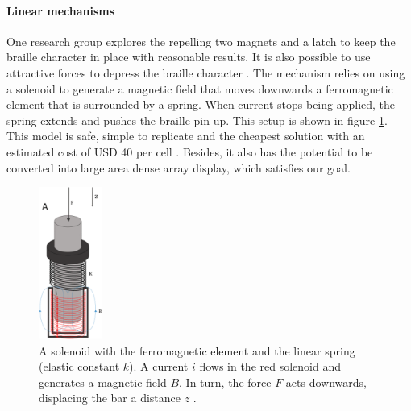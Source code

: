 \paragraph{Linear mechanisms}
One research group explores the repelling two magnets and a latch to keep the braille character in place \cite{kim_braille_2020} with reasonable results.
It is also possible to use attractive forces to depress the braille character \cite{bettelani_design_2020}.
The mechanism relies on using a solenoid to generate a magnetic field that moves downwards a ferromagnetic element that is surrounded by a spring.
When current stops being applied, the spring extends and pushes the braille pin up.
This setup is shown in figure \ref{fig:magnetic-spring.png}.
This model is safe, simple to replicate and the cheapest solution with an estimated cost of USD 40 per cell \cite{bettelani_design_2020}.
Besides, it also has the potential to be converted into large area dense array display, which satisfies our goal. 

\begin{figure}[h] \centering
    \includegraphics[height=5cm]{figures/magnetic-spring.png}
\caption[Linear magnetic actuation mechanism]{A solenoid with the ferromagnetic element and the linear spring (elastic constant $k$). A current $i$ flows in the red solenoid and generates a magnetic field $B$. In turn, the force $F$ acts downwards, displacing the bar a distance $z$ \cite{bettelani_design_2020}.}
\label{fig:magnetic-spring.png}
\end{figure}

